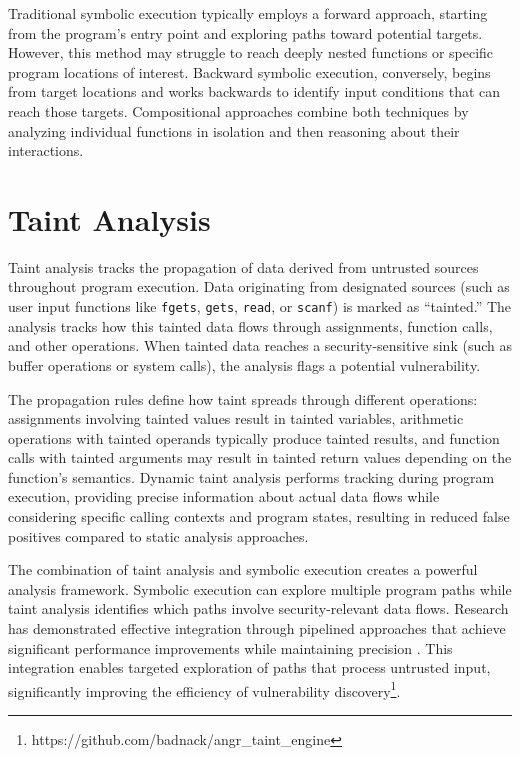 Traditional symbolic execution typically employs a forward approach, starting from the program's entry point and exploring paths toward potential targets. However, this method may struggle to reach deeply nested functions or specific program locations of interest. Backward symbolic execution, conversely, begins from target locations and works backwards to identify input conditions that can reach those targets. Compositional approaches combine both techniques by analyzing individual functions in isolation and then reasoning about their interactions.

\section{Taint Analysis}

Taint analysis tracks the propagation of data derived from untrusted sources throughout program execution. Data originating from designated sources (such as user input functions like \texttt{fgets}, \texttt{gets}, \texttt{read}, or \texttt{scanf}) is marked as ``tainted.'' The analysis tracks how this tainted data flows through assignments, function calls, and other operations. When tainted data reaches a security-sensitive sink (such as buffer operations or system calls), the analysis flags a potential vulnerability.

The propagation rules define how taint spreads through different operations: assignments involving tainted values result in tainted variables, arithmetic operations with tainted operands typically produce tainted results, and function calls with tainted arguments may result in tainted return values depending on the function's semantics. Dynamic taint analysis performs tracking during program execution, providing precise information about actual data flows while considering specific calling contexts and program states, resulting in reduced false positives compared to static analysis approaches.

The combination of taint analysis and symbolic execution creates a powerful analysis framework. Symbolic execution can explore multiple program paths while taint analysis identifies which paths involve security-relevant data flows. Research has demonstrated effective integration through pipelined approaches that achieve significant performance improvements while maintaining precision \cite{ming_taintpipe_2015}. This integration enables targeted exploration of paths that process untrusted input, significantly improving the efficiency of vulnerability discovery\footnote{https://github.com/badnack/angr\_taint\_engine}.

